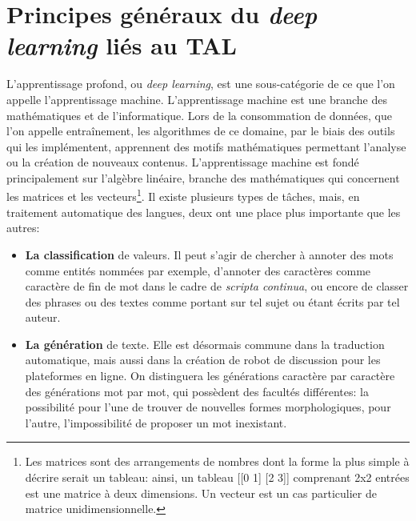 \section{Principes généraux du \textit{deep learning} liés au TAL}

L'apprentissage profond, ou \textit{deep learning}, est une sous-catégorie de ce que l'on appelle l'apprentissage machine. L'apprentissage machine est une branche des mathématiques et de l'informatique. Lors de la consommation de données, que l'on appelle entraînement, les algorithmes de ce domaine, par le biais des outils qui les implémentent, apprennent des motifs mathématiques permettant l'analyse ou la création de nouveaux contenus. L'apprentissage machine est fondé principalement sur l'algèbre linéaire, branche des mathématiques qui concernent les matrices et les vecteurs\footnote{Les matrices sont des arrangements de nombres dont la forme la plus simple à décrire serait un tableau: ainsi, un tableau [[0 1] [2 3]] comprenant 2x2 entrées est une matrice à deux dimensions. Un vecteur est un cas particulier de matrice unidimensionnelle.}. Il existe plusieurs types de tâches, mais, en traitement automatique des langues, deux ont une place plus importante que les autres:

\begin{itemize}
    \item \textbf{La classification} de valeurs. Il peut s'agir de chercher à annoter des mots comme entités nommées par exemple, d'annoter des caractères comme caractère de fin de mot dans le cadre de \textit{scripta continua}, ou encore de classer des phrases ou des textes comme portant sur tel sujet ou étant écrits par tel auteur.
    \item \textbf{La génération} de texte. Elle est désormais commune dans la traduction automatique, mais aussi dans la création de robot de discussion pour les plateformes en ligne. On distinguera les générations caractère par caractère des générations mot par mot, qui possèdent des facultés différentes: la possibilité pour l'une de trouver de nouvelles formes morphologiques, pour l'autre, l'impossibilité de proposer un mot inexistant.
\end{itemize}{}

